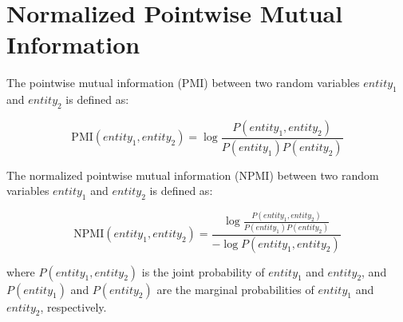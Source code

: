\documentclass{article}
\begin{document}
\section*{Normalized Pointwise Mutual Information}

The pointwise mutual information (PMI) between two random variables \(entity_1\) and \(entity_2\) is defined as:

\begin{equation}
\text{PMI}(entity_1, entity_2) = \log \frac{P(entity_1, entity_2)}{P(entity_1) P(entity_2)}
\end{equation}

The normalized pointwise mutual information (NPMI) between two random variables \(entity_1\) and \(entity_2\) is defined as:

\begin{equation}
\text{NPMI}(entity_1, entity_2) = \frac{\log \frac{P(entity_1, entity_2)}{P(entity_1) P(entity_2)}}{-\log P(entity_1, entity_2)}
\end{equation}

where \(P(entity_1, entity_2)\) is the joint probability of \(entity_1\) and \(entity_2\), and \(P(entity_1)\) and \(P(entity_2)\) are the marginal probabilities of \(entity_1\) and \(entity_2\), respectively.
\end{document}
